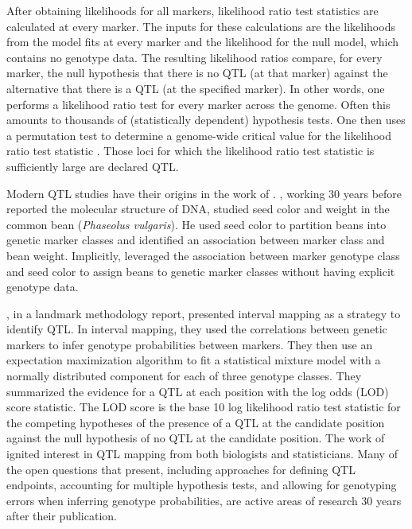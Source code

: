 \documentclass[]{article}\usepackage[]{graphicx}\usepackage[]{color}
\begin{document}
After obtaining likelihoods for all markers, likelihood ratio test statistics are calculated
at every marker. The inputs for these calculations are the likelihoods from the model fits at
every marker and the likelihood for the null model, which contains no genotype data.
The resulting likelihood ratios compare, for every marker, the null hypothesis that there is no 
QTL (at that marker) against the alternative that there is a QTL (at the specified marker).
In other words, one performs a likelihood ratio test for every marker across the genome.
Often this amounts to thousands of (statistically dependent) hypothesis tests.
One then uses a permutation test to determine a genome-wide critical value
for the likelihood ratio test statistic \citep{churchill1994empirical}.
Those loci for which the likelihood ratio test statistic is sufficiently large are declared QTL. 


Modern QTL studies have their origins in the work of \citet{sax1923association}.
\citet{sax1923association}, working 30 years before \citet{watson1953molecular} reported
the molecular structure of DNA, studied seed color and weight in the common bean
(\emph{Phaseolus vulgaris}). He used seed color to partition beans into genetic
marker classes and identified an association between marker class and bean weight. Implicitly, \citet{sax1923association} leveraged the association between marker genotype class and seed color to assign beans to genetic marker classes without having explicit genotype data.



\citet{lander1989mapping}, in a landmark methodology report, presented
interval mapping as a strategy to identify QTL. 
In interval mapping, they used the correlations between genetic markers
to infer genotype probabilities between markers.
They then use an expectation maximization algorithm \citep{dempster1977maximum, lander1987construction}
to fit a statistical mixture model with a normally distributed component for each of three genotype classes. 
They summarized the evidence for a QTL at each position with the log odds (LOD) score statistic.
The LOD score is the base 10 log likelihood ratio test statistic for
the competing hypotheses of the presence of a QTL at the candidate position
against the null hypothesis of no QTL at the candidate position. 
The work of \citet{lander1989mapping} ignited interest in QTL mapping from
both biologists and statisticians.
Many of the open questions that \citet{lander1989mapping} present, including approaches
for defining QTL endpoints, accounting for multiple hypothesis tests, and
allowing for genotyping errors when inferring genotype probabilities,
are active areas of research 30 years after their publication.
\end{document}

